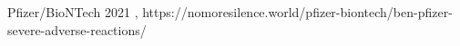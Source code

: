           {
          }
          {
          }
          {
            Pfizer/BioNTech
          }
          {
            2021
          }
          {
            ,
          }
          {
            https://nomoresilence.world/pfizer-biontech/ben-pfizer-severe-adverse-reactions/
          }
